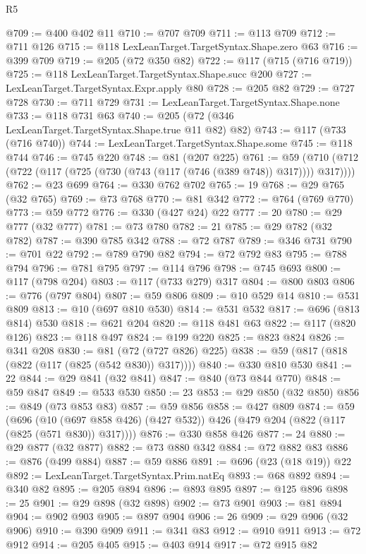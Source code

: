 \begin{lexlean}{R5}
\begin{coremodule}
@709 := @400 @402 @11
@710 := @707 @709
@711 := @113 @709
@712 := @711 @126
@715 := @118 LexLeanTarget.TargetSyntax.Shape.zero @63
@716 := @399 @709
@719 := @205 (@72 @350 @82)
@722 := @117 (@715 (@716 @719))
@725 := @118 LexLeanTarget.TargetSyntax.Shape.succ @200
@727 := LexLeanTarget.TargetSyntax.Expr.apply @80
@728 := @205 @82
@729 := @727 @728
@730 := @711 @729
@731 := LexLeanTarget.TargetSyntax.Shape.none
@733 := @118 @731 @63
@740 := @205 (@72 (@346 LexLeanTarget.TargetSyntax.Shape.true @11 @82) @82)
@743 := @117 (@733 (@716 @740))
@744 := LexLeanTarget.TargetSyntax.Shape.some
@745 := @118 @744
@746 := @745 @220
@748 := @81 (@207 @225)
@761 := @59 (@710 (@712 (@722 (@117 (@725 (@730 (@743 (@117 (@746 (@389 @748)) @317)))) @317))))
@762 := @23 @699
@764 := @330 @762 @702
@765 := 19
@768 := @29 @765 (@32 @765)
@769 := @73 @768
@770 := @81 @342
@772 := @764 (@769 @770)
@773 := @59 @772
@776 := @330 (@427 @24) @22
@777 := 20
@780 := @29 @777 (@32 @777)
@781 := @73 @780
@782 := 21
@785 := @29 @782 (@32 @782)
@787 := @390 @785 @342
@788 := @72 @787
@789 := @346 @731
@790 := @701 @22
@792 := @789 @790 @82
@794 := @72 @792 @83
@795 := @788 @794
@796 := @781 @795
@797 := @114 @796
@798 := @745 @693
@800 := @117 (@798 @204)
@803 := @117 (@733 @279) @317
@804 := @800 @803
@806 := @776 (@797 @804)
@807 := @59 @806
@809 := @10 @529 @14
@810 := @531 @809
@813 := @10 (@697 @810 @530)
@814 := @531 @532
@817 := @696 (@813 @814) @530
@818 := @621 @204
@820 := @118 @481 @63
@822 := @117 (@820 @126)
@823 := @118 @497
@824 := @199 @220
@825 := @823 @824
@826 := @341 @208
@830 := @81 (@72 (@727 @826) @225)
@838 := @59 (@817 (@818 (@822 (@117 (@825 (@542 @830)) @317))))
@840 := @330 @810 @530
@841 := 22
@844 := @29 @841 (@32 @841)
@847 := @840 (@73 @844 @770)
@848 := @59 @847
@849 := @533 @530
@850 := 23
@853 := @29 @850 (@32 @850)
@856 := @849 (@73 @853 @83)
@857 := @59 @856
@858 := @427 @809
@874 := @59
    (@696 (@10 (@697 @858 @426) (@427 @532)) @426 (@479 @204 (@822 (@117 (@825 (@571 @830)) @317))))
@876 := @330 @858 @426
@877 := 24
@880 := @29 @877 (@32 @877)
@882 := @73 @880 @342
@884 := @72 @882 @83
@886 := @876 (@499 @884)
@887 := @59 @886
@891 := @696 (@23 (@18 @19)) @22
@892 := LexLeanTarget.TargetSyntax.Prim.natEq
@893 := @68 @892
@894 := @340 @82
@895 := @205 @894
@896 := @893 @895
@897 := @125 @896
@898 := 25
@901 := @29 @898 (@32 @898)
@902 := @73 @901
@903 := @81 @894
@904 := @902 @903
@905 := @897 @904
@906 := 26
@909 := @29 @906 (@32 @906)
@910 := @390 @909
@911 := @341 @83
@912 := @910 @911
@913 := @72 @912
@914 := @205 @405
@915 := @403 @914
@917 := @72 @915 @82

\end{coremodule}
\end{lexlean}
